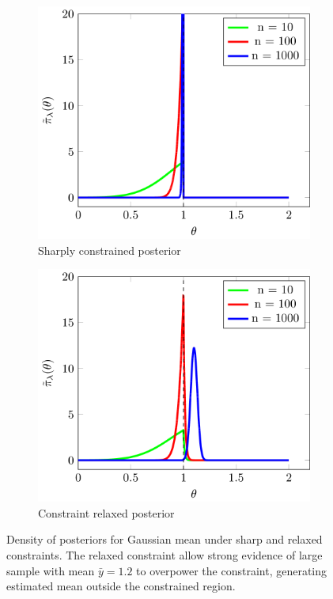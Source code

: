 \documentclass[10pt,fleqn]{article}
\DeclareMathOperator{\1}{\mathbbm{1}} \DeclareMathOperator{\bigO}{\mc O}
\begin{document}
\begin{figure}[H]
\begin{subfigure}[b]{0.45\textwidth}
 \includegraphics[width=1\textwidth]{gaussianInequalitySharp.png}
 \caption{Sharply constrained posterior}
\end{subfigure}
\begin{subfigure}[b]{0.45\textwidth}
 \includegraphics[width=1\textwidth]{gaussianInequalityRelaxed.png}
 \caption{Constraint relaxed posterior}
\end{subfigure}
 \caption{Density of posteriors for Gaussian mean under sharp and relaxed constraints. The relaxed constraint allow strong evidence of large
 sample with mean $\bar y=1.2$ to overpower the constraint,
  generating estimated
 mean outside the constrained region.  \label{fig:gaussian_inequality}}
\end{figure}
\end{document}
